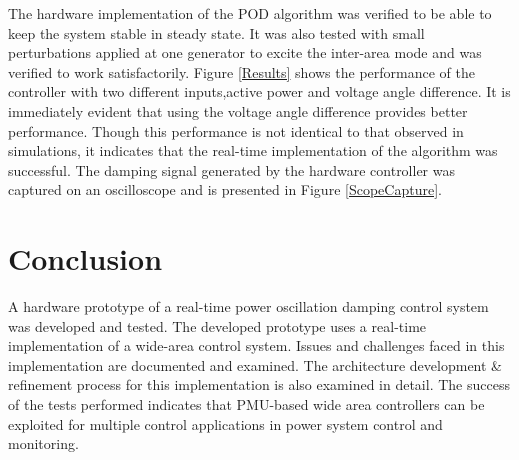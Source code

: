 \documentclass[conference]{IEEEtran}
\begin{document}
The hardware implementation of the POD algorithm was verified to be able to keep the system stable in steady state. It was also tested with small perturbations applied at one generator to excite the inter-area mode and was verified to work satisfactorily. Figure \ref{Results} shows the performance of the controller with two different inputs,active power and voltage angle difference. It is immediately evident that using the voltage angle difference provides better performance. Though this performance is not identical to that observed in simulations, it indicates that the real-time implementation of the algorithm was successful. The damping signal generated by the hardware controller was captured on an oscilloscope and is presented in Figure \ref{ScopeCapture}.
\section{Conclusion} \label{conclusion}
A hardware prototype of a real-time power oscillation damping control system was developed and tested. The developed prototype uses a real-time implementation of a wide-area control system. Issues and challenges faced in this implementation are documented and examined. The architecture development \& refinement process for this implementation is also examined in detail. The success of the tests performed indicates that PMU-based wide area controllers can be exploited for multiple control applications in power system control and monitoring.

\end{document}
